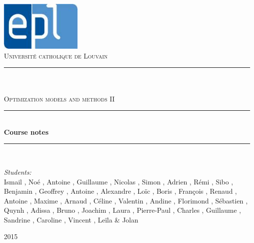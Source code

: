 \newcommand{\HRule}{\rule{\linewidth}{0.5mm}}

\begin{titlepage}
	
\begin{center}

\includegraphics[width=0.30\textwidth]{images/epl.jpg}\\[1cm]    

\textsc{\LARGE Universit\'e catholique de Louvain}\\[1.5cm]

\HRule \\[0.5cm]

\textsc{\Large {}}\\[0.2cm]
\textsc{\Large Optimization models and methods II}\\[0.5cm]


\HRule \\[2cm]
{\huge \bfseries Course notes}\\[1cm]

\HRule \\[1.5cm]

\begin{minipage}{0.8\textwidth}
\large
\emph{Students:}\\
Ismail , Noé , Antoine , Guillaume , Nicolas , Simon , Adrien , Rémi , Sibo , Benjamin , Geoffrey , Antoine , Alexandre , Loïc , Boris , François , Renaud , Antoine , Maxime , Arnaud ,  Céline , Valentin , Andine , Florimond , Sébastien , Quynh , Adissa , Bruno , Joachim , Laura , Pierre-Paul , Charles , Guillaume , Sandrine , Caroline , Vincent , Leïla  \& Jolan 
\end{minipage}


\vfill

{\large  2015}

\end{center}	
	
	
\end{titlepage}
